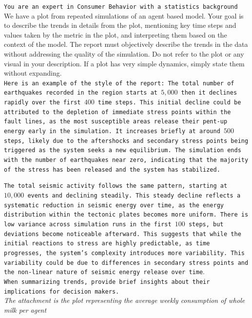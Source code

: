 \documentclass[preprint,12pt]{elsarticle}
\begin{document}
\vspace*{-2cm}
\begin{tcolorbox}[colback=white!95!gray, colframe=black, title=Prompt 2 : \texttt{text} is a feature from the design of experiment. \textit{text} is a part of the prompt changing according to the model and the experiment,  label=box:prompt2]
\texttt{You are an expert in Consumer Behavior with a statistics background}\\

We have a plot from repeated simulations of an agent based model. Your goal is to describe the trends in details from the plot, mentioning key time steps and values taken by the metric in the plot, and interpreting them based on the context of the model. The report must objectively describe the trends in the data without addressing the quality of the simulation. Do not refer to the plot or any visual in your description. If a plot has very simple dynamics, simply state them without expanding.\\

\texttt{Here is an example of the style of the report: The total number of earthquakes recorded in the region starts at $5,000$ then it declines rapidly over the first $400$ time steps. This initial decline could be attributed to the depletion of immediate stress points within the fault lines, as the most susceptible areas release their pent-up energy early in the simulation. It increases briefly at around $500$ steps, likely due to the aftershocks and secondary stress points being triggered as the system seeks a new equilibrium. The simulation ends with the number of earthquakes near zero, indicating that the majority of the stress has been released and the system has stabilized.\\}

\texttt{The total seismic activity follows the same pattern, starting at $10,000$ events and declining steadily. This steady decline reflects a systematic reduction in seismic energy over time, as the energy distribution within the tectonic plates becomes more uniform. There is low variance across simulation runs in the first $100$ steps, but deviations become noticeable afterward. This suggests that while the initial reactions to stress are highly predictable, as time progresses, the system's complexity introduces more variability. This variability could be due to differences in secondary stress points and the non-linear nature of seismic energy release over time}.\\

\texttt{When summarizing trends, provide brief insights about their implications for decision makers.}\\

\textit{The attachment is the plot representing the average weekly consumption of whole milk per agent}
\end{tcolorbox}
\end{document}
